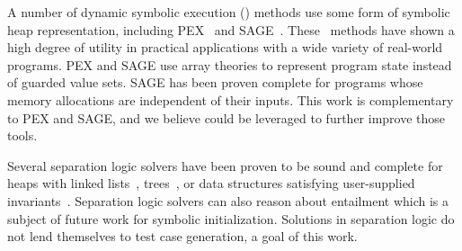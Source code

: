 
A number of dynamic symbolic execution (\dsetxt{}) methods use some form 
of symbolic heap representation, including PEX~\cite{Tillmann:2008} and SAGE~\cite{Elkarablieh:2009}. These~\dsetxt{} methods have shown a high degree of utility in practical applications with a wide variety of real-world programs. PEX and SAGE use array theories to represent program state instead of guarded value sets.
SAGE has been proven complete for programs whose memory allocations are independent of their inputs. This work is complementary to PEX and SAGE, and we believe could be leveraged to further improve those tools. 

Several separation logic solvers have been proven to be sound and complete for heaps with linked lists~\cite{Navarro:2011,Cook:2011,Berdine:2005}, trees~\cite{Piskac:2014}, or data structures satisfying user-supplied invariants~\cite{Brotherston:2014}. Separation logic solvers can also reason about entailment which is a subject of future work for symbolic initialization. Solutions in separation logic do not lend themselves to test case generation,  a goal of this work. 


%
%
%

%
%
%
%
%
